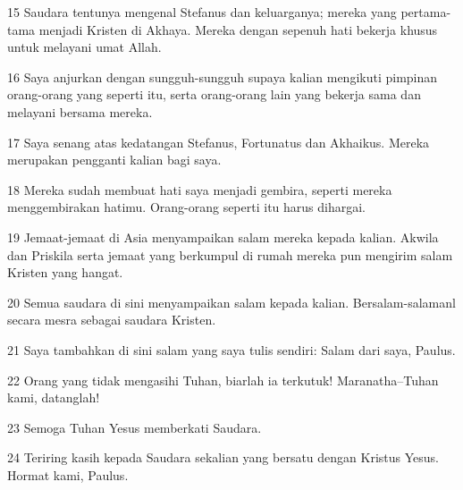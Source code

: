 \par 15 Saudara tentunya mengenal Stefanus dan keluarganya; mereka yang pertama-tama menjadi Kristen di Akhaya. Mereka dengan sepenuh hati bekerja khusus untuk melayani umat Allah.
\par 16 Saya anjurkan dengan sungguh-sungguh supaya kalian mengikuti pimpinan orang-orang yang seperti itu, serta orang-orang lain yang bekerja sama dan melayani bersama mereka.
\par 17 Saya senang atas kedatangan Stefanus, Fortunatus dan Akhaikus. Mereka merupakan pengganti kalian bagi saya.
\par 18 Mereka sudah membuat hati saya menjadi gembira, seperti mereka menggembirakan hatimu. Orang-orang seperti itu harus dihargai.
\par 19 Jemaat-jemaat di Asia menyampaikan salam mereka kepada kalian. Akwila dan Priskila serta jemaat yang berkumpul di rumah mereka pun mengirim salam Kristen yang hangat.
\par 20 Semua saudara di sini menyampaikan salam kepada kalian. Bersalam-salamanl secara mesra sebagai saudara Kristen.
\par 21 Saya tambahkan di sini salam yang saya tulis sendiri: Salam dari saya, Paulus.
\par 22 Orang yang tidak mengasihi Tuhan, biarlah ia terkutuk! Maranatha--Tuhan kami, datanglah!
\par 23 Semoga Tuhan Yesus memberkati Saudara.
\par 24 Teriring kasih kepada Saudara sekalian yang bersatu dengan Kristus Yesus. Hormat kami, Paulus.


